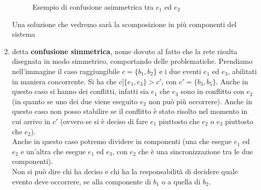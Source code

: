 \documentclass[a4paper,12pt, oneside]{book}
\begin{document}
\begin{definizione}
\begin{enumerate}
\begin{figure}[H]
      \caption{Esempio di confusione asimmetrica tra $e_1$ ed $e_2$} 
    \end{figure}
    Una soluzione che vedremo sarà la scomposizione in più componenti del
    sistema 
    \item detta \textbf{confusione simmetrica}, nome dovuto al fatto che la rete
    risulta disegnata in modo simmetrico, comportando delle
    problematiche. Prendiamo nell'immagine il caso raggiungibile $c=\{b_1,b_2\}$
    e i due eventi $e_1$ ed $e_3$, abilitati in maniera concorrente. Si ha che
    $c[\{e_1,e_3\}>c'$, con $c'=\{b_3,b_5\}$. Anche in questo caso si hanno dei
    conflitti, infatti sia $e_1$ che $e_3$ sono in conflitto con $e_2$ (in
    quanto se uno dei due viene eseguito $e_2$ non può più occorrere). Anche in
    questo caso non posso stabilire se il conflitto è stato risolto nel momento
    in cui arrivo in $c'$ (ovvero se si è deciso di fare $e_1$ piuttosto che
    $e_2$ o $e_3$ piuttosto che $e_2$).\\
    Anche in questo caso potremo dividere in componenti (una che esegue $e_1$ ed
    $e_2$ e un'altra che esegue $e_1$ ed $e_3$, con $e_2$ che è una
    sincronizzazione tra le due componenti).\\
    Non si può dire chi ha deciso e chi ha la responsabilità di decidere quale
    evento deve occorrere, se alla componente di $b_1$ o a quella di $b_2$.\\
    \begin{figure}[H]
      \centering
\end{figure}
\end{enumerate}
\end{definizione}
\end{document}
